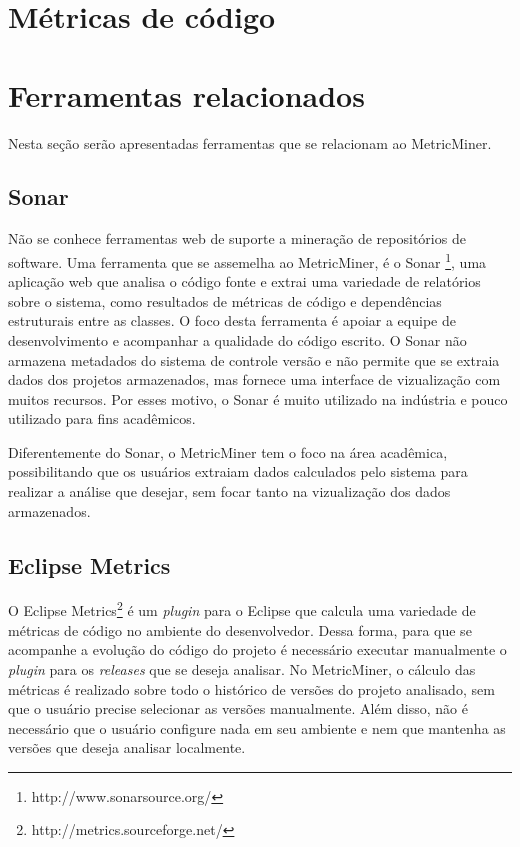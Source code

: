 \documentclass[a4paper, 12pt, twoside]{book}
\begin{document}
    \section{Métricas de código}

    \section{Ferramentas relacionados} \label{ch:trabalhos}

    Nesta seção serão apresentadas ferramentas que se relacionam ao MetricMiner.
    \subsection{Sonar}
        Não se conhece ferramentas web de suporte a mineração de repositórios de software. Uma ferramenta que se assemelha ao MetricMiner, é o Sonar \footnote{http://www.sonarsource.org/}, uma aplicação web que analisa o código fonte e extrai uma variedade de relatórios sobre o sistema, como resultados de métricas de código e dependências estruturais entre as classes. O foco desta ferramenta é apoiar a equipe de desenvolvimento e acompanhar a qualidade do código escrito. O Sonar não armazena metadados do sistema de controle versão e não permite que se extraia dados dos projetos armazenados, mas fornece uma interface de vizualização com muitos recursos. Por esses motivo, o Sonar é muito utilizado na indústria e pouco utilizado para fins acadêmicos.
        
        Diferentemente do Sonar, o MetricMiner tem o foco na área acadêmica, possibilitando que os usuários extraiam dados calculados pelo sistema para realizar a análise que desejar, sem focar tanto na vizualização dos dados armazenados.
    
    \subsection{Eclipse Metrics}
        O Eclipse Metrics\footnote{http://metrics.sourceforge.net/} é um \textit{plugin} para o Eclipse que calcula uma variedade de métricas de código no ambiente do desenvolvedor. Dessa forma, para que se acompanhe a evolução do código do projeto é necessário executar manualmente o \textit{plugin} para os \textit{releases} que se deseja analisar. No MetricMiner, o cálculo das métricas é realizado sobre todo o histórico de versões do projeto analisado, sem que o usuário precise selecionar as versões manualmente. Além disso, não é necessário que o usuário configure nada em seu ambiente e nem que mantenha as versões que deseja analisar localmente.
        
\end{document}
